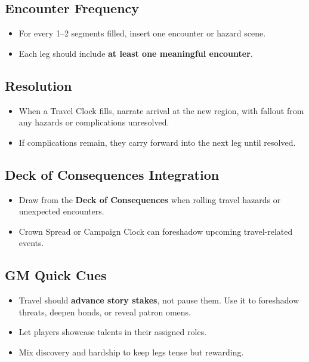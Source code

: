 \subsection{Encounter Frequency}
\begin{itemize}
  \item For every 1--2 segments filled, insert one encounter or hazard scene.
  \item Each leg should include \textbf{at least one meaningful encounter}.
\end{itemize}

\subsection{Resolution}
\begin{itemize}
  \item When a Travel Clock fills, narrate arrival at the new region, with fallout from any hazards or complications unresolved.
  \item If complications remain, they carry forward into the next leg until resolved.
\end{itemize}

\subsection{Deck of Consequences Integration}
\begin{itemize}
  \item Draw from the \textbf{Deck of Consequences} when rolling travel hazards or unexpected encounters.
  \item Crown Spread or Campaign Clock can foreshadow upcoming travel-related events.
\end{itemize}

\subsection{GM Quick Cues}
\begin{itemize}
  \item Travel should \textbf{advance story stakes}, not pause them. Use it to foreshadow threats, deepen bonds, or reveal patron omens.
  \item Let players showcase talents in their assigned roles.
  \item Mix discovery and hardship to keep legs tense but rewarding.
\end{itemize}
